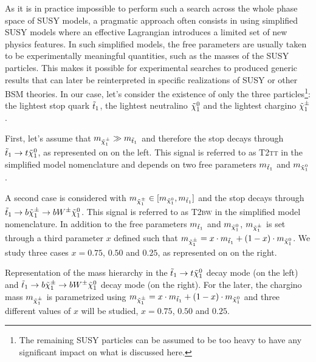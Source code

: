 
        As it is in practice impossible to perform such a search across the whole phase
        space of SUSY models, a pragmatic approach often consists in using simplified SUSY
        models where an
        effective Lagrangian introduces a limited set of new physics features. In such
        simplified models, the free parameters are usually taken to be experimentally
        meaningful quantities, such as the masses of the SUSY particles. This makes
        it possible for experimental searches to produced generic results that can later
        be reinterpreted in specific realizations of SUSY \cite{LiemSMS, SmodelS}
        or other BSM theories. In our case, let's consider the existence of only the three
        particles\footnote{The remaining SUSY particles can be assumed to be too heavy to
        have any significant impact on what is discussed here.}: the lightest stop quark
        $\tilde{t}_1$, the lightest neutralino $\tilde{\chi}_1^0$ and the lightest chargino $
        \tilde{\chi}_1^\pm$.

        First, let's assume that $m_{\tilde{\chi}_1^\pm} \gg m_{\tilde{t}_1}$ and therefore the
        stop decays through $\tilde{t}_1 \rightarrow t \tilde{\chi}_1^0$, as represented on
         on the left. This signal is referred to as \textsc{T2tt}
        in the simplified model nomenclature and depends on two free parameters
        $m_{\tilde{t}_1}$ and $m_{\tilde{\chi}_1^0}$.

        A second case is considered with $m_{\tilde{\chi}_1^\pm} \in [m_{\tilde{\chi}_1^0},
        m_{\tilde{t}_1}]$ and the stop decays through $\tilde{t}_1 \rightarrow b \tilde{\chi}_1^\pm
        \rightarrow b W^{\pm} \tilde{\chi}_1^0$. This signal is referred to as \textsc{T2bw}
        in the simplified model nomenclature. In addition to the free  parameters
        $m_{\tilde{t}_1}$ and $m_{\tilde{\chi}_1^0}$, $m_{\tilde{\chi}_1^\pm}$ is set through a
        third parameter $x$ defined such that $m_{\tilde{\chi}_1^\pm} = x \cdot m_{\tilde{t}_1}
        + (1 - x) \cdot m_{\tilde{\chi}_1^0}$. We study three cases $x = 0.75$, $0.50$
        and $0.25$, as represented on  on the right.

                     {Representation of the mass hierarchy in the $\tilde{t}_1 \rightarrow t
                     \tilde{\chi}_1^0$ decay mode (on the left) and $\tilde{t}_1 \rightarrow b
                     \tilde{\chi}_1^\pm \rightarrow b W^{\pm} \tilde{\chi}_1^0 $ decay mode (on the
                     right). For the later, the chargino mass $m_{\tilde{\chi}_1^\pm}$ is
                     parametrized using $m_{\tilde{\chi}_1^\pm} = x \cdot m_{\tilde{t}_1}
                     + (1 - x) \cdot m_{\tilde{\chi}_1^0}$ and three different values of $x$ will
                     be studied, $x = 0.75$, $0.50$ and $0.25$.}

